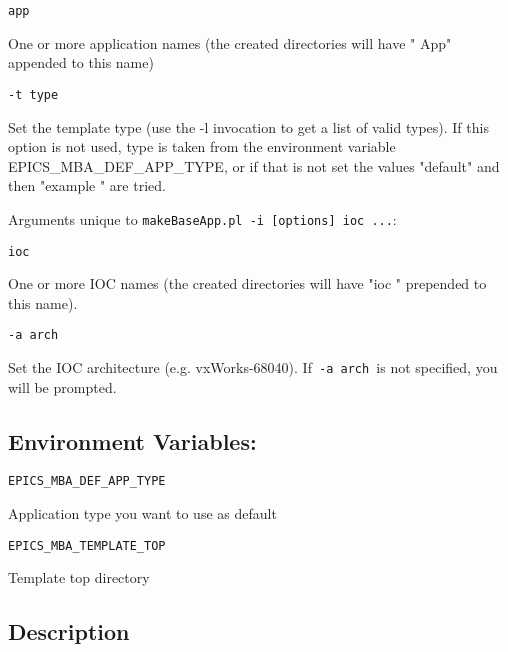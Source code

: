 \begin{verbatim}app     
\end{verbatim}\begin{description}\item One or more application names (the created directories will have " App" appended to this name)

\end{description}\begin{verbatim}-t type     
\end{verbatim}\begin{description}\item Set the template type (use the -l invocation to get a list of valid types). If this option is not used, type is taken from 
the environment variable EPICS\_MBA\_DEF\_APP\_TYPE, or if that is not set the values "default" and then 
"example " are tried.

\end{description}Arguments unique to \verb|makeBaseApp.pl -i [options] ioc ...|:

\begin{verbatim}ioc 
\end{verbatim}One or more IOC names (the created directories will have "ioc " prepended to this name).

\begin{verbatim}-a arch     
\end{verbatim}\begin{description}\item Set the IOC architecture (e.g. vxWorks-68040).  If\verb| -a arch |is not specified, you will be prompted.

\end{description}\subsection{Environment Variables:}

\begin{verbatim}EPICS_MBA_DEF_APP_TYPE
\end{verbatim}\begin{description}\item Application type you want to use as default

\end{description}\begin{verbatim}EPICS_MBA_TEMPLATE_TOP
\end{verbatim}\begin{description}\item Template top directory

\end{description}\subsection{Description}

